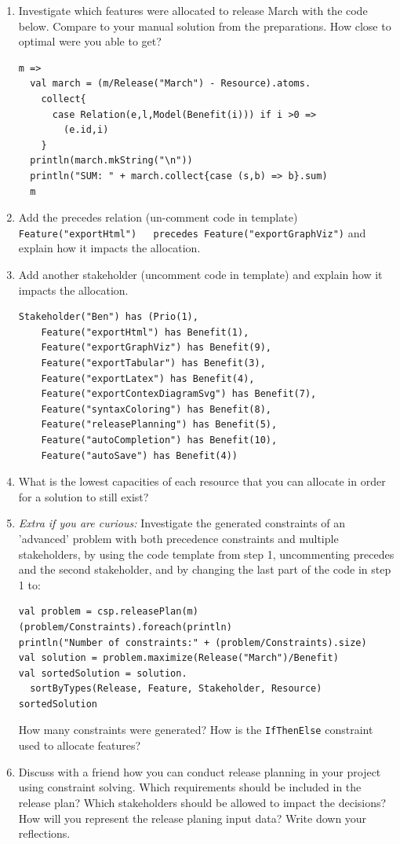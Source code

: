 \documentclass[11pt]{article}
\begin{document}
\begin{framed}
\begin{enumerate}
\item Investigate which features were allocated to release March with the code below. Compare to your manual solution from the preparations. How close to optimal were you able to get?

\begin{lstlisting}
m =>
  val march = (m/Release("March") - Resource).atoms.
    collect{
      case Relation(e,l,Model(Benefit(i))) if i >0 => 
        (e.id,i)
    }
  println(march.mkString("\n"))
  println("SUM: " + march.collect{case (s,b) => b}.sum)
  m  
\end{lstlisting}
\item Add the precedes relation (un-comment code in template) 
\newline\lstinline+ Feature("exportHtml")   precedes Feature("exportGraphViz")+ \newline and explain how  it impacts the allocation.  
\item Add another stakeholder (uncomment code in template) and explain how it impacts the allocation.
\begin{lstlisting}
Stakeholder("Ben") has (Prio(1), 
    Feature("exportHtml") has Benefit(1),
    Feature("exportGraphViz") has Benefit(9),
    Feature("exportTabular") has Benefit(3),
    Feature("exportLatex") has Benefit(4),
    Feature("exportContexDiagramSvg") has Benefit(7),
    Feature("syntaxColoring") has Benefit(8),    
    Feature("releasePlanning") has Benefit(5),    
    Feature("autoCompletion") has Benefit(10),    
    Feature("autoSave") has Benefit(4)) 
\end{lstlisting}   
\item What is the lowest capacities of each resource that you can allocate in order for a solution to still exist?
\vspace{1.5em}
\item {\it Extra if you are curious:} Investigate the generated constraints of an 'advanced' problem with both precedence constraints and multiple stakeholders, by using the code template from step 1, uncommenting precedes and the second stakeholder, and by changing the last part of the code in step 1 to:
\begin{lstlisting}
val problem = csp.releasePlan(m)
(problem/Constraints).foreach(println)
println("Number of constraints:" + (problem/Constraints).size)
val solution = problem.maximize(Release("March")/Benefit)
val sortedSolution = solution.
  sortByTypes(Release, Feature, Stakeholder, Resource)
sortedSolution
\end{lstlisting}   
How many constraints were generated?
How is the \verb+IfThenElse+ constraint used to allocate features?
\item Discuss with a friend how you can conduct release planning in your project using constraint solving. Which requirements should be included in the release plan? Which stakeholders should be allowed to impact the decisions? How will you represent the release planing input data? Write down your reflections.
\vspace{22em}
\end{enumerate}

\end{framed}
\end{document}
